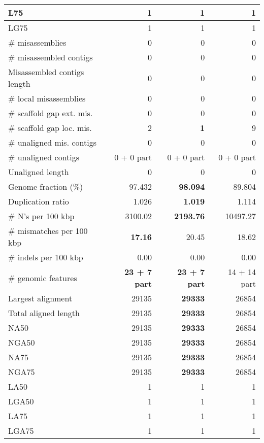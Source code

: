 \documentclass[12pt,a4paper]{article}
\begin{document}
\begin{table}[ht]
\begin{center}
\begin{tabular}{|l*{3}{|r}|}
L75 & 1 & 1 & 1 \\ \hline
LG75 & 1 & 1 & 1 \\ \hline
\# misassemblies & 0 & 0 & 0 \\ \hline
\# misassembled contigs & 0 & 0 & 0 \\ \hline
Misassembled contigs length & 0 & 0 & 0 \\ \hline
\# local misassemblies & 0 & 0 & 0 \\ \hline
\# scaffold gap ext. mis. & 0 & 0 & 0 \\ \hline
\# scaffold gap loc. mis. & 2 & {\bf 1} & 9 \\ \hline
\# unaligned mis. contigs & 0 & 0 & 0 \\ \hline
\# unaligned contigs & 0 + 0 part & 0 + 0 part & 0 + 0 part \\ \hline
Unaligned length & 0 & 0 & 0 \\ \hline
Genome fraction (\%) & 97.432 & {\bf 98.094} & 89.804 \\ \hline
Duplication ratio & 1.026 & {\bf 1.019} & 1.114 \\ \hline
\# N's per 100 kbp & 3100.02 & {\bf 2193.76} & 10497.27 \\ \hline
\# mismatches per 100 kbp & {\bf 17.16} & 20.45 & 18.62 \\ \hline
\# indels per 100 kbp & 0.00 & 0.00 & 0.00 \\ \hline
\# genomic features & {\bf 23 + 7 part} & {\bf 23 + 7 part} & 14 + 14 part \\ \hline
Largest alignment & 29135 & {\bf 29333} & 26854 \\ \hline
Total aligned length & 29135 & {\bf 29333} & 26854 \\ \hline
NA50 & 29135 & {\bf 29333} & 26854 \\ \hline
NGA50 & 29135 & {\bf 29333} & 26854 \\ \hline
NA75 & 29135 & {\bf 29333} & 26854 \\ \hline
NGA75 & 29135 & {\bf 29333} & 26854 \\ \hline
LA50 & 1 & 1 & 1 \\ \hline
LGA50 & 1 & 1 & 1 \\ \hline
LA75 & 1 & 1 & 1 \\ \hline
LGA75 & 1 & 1 & 1 \\ \hline
\end{tabular}
\end{center}
\end{table}
\end{document}

